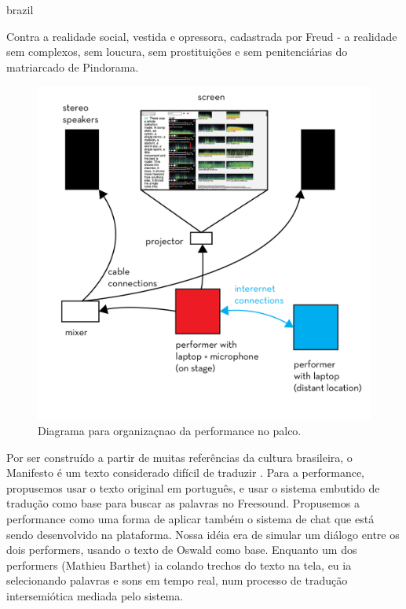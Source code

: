 \begin{otherlanguage*}{brazil}
\begin{citacao}
Contra a realidade social, vestida e opressora, cadastrada por Freud - a realidade sem complexos, sem loucura, sem prostituições e sem penitenciárias do matriarcado de Pindorama. \cite{Andrade1928}
\end{citacao}

\begin{figure}[hb!]
\centering
\includegraphics[width=1\linewidth]{pictures/cap4/diagrama-cannibal}
\caption{Diagrama para organizaçnao da performance no palco.}
\label{diagram}
\end{figure}

Por ser construído a partir de muitas referências da cultura brasileira, o Manifesto é um texto considerado difícil de traduzir \cite{Lesli-1991}. Para a performance, propusemos usar o texto original em português, e usar o sistema embutido de tradução como base para buscar as palavras no Freesound. Propusemos a performance como uma forma de aplicar também o sistema de chat que está sendo desenvolvido na plataforma. Nossa idéia era de simular um diálogo entre os dois performers, usando o texto de Oswald como base. Enquanto um dos performers (Mathieu Barthet) ia colando trechos do texto na tela, eu ia selecionando palavras e sons em tempo real, num processo de tradução intersemiótica \cite{JulioPlaza1969} mediada pelo sistema. 


\end{otherlanguage*}
